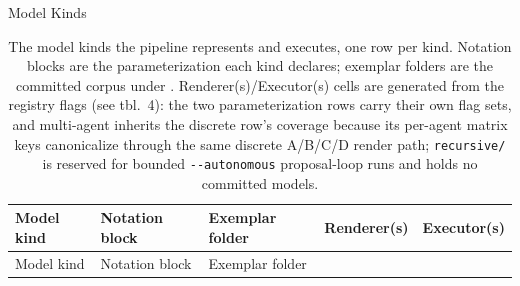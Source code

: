 \documentclass[
  ignorenonframetext,
]{beamer}
\begin{document}
\begin{frame}{Model Kinds}
\begin{longtable}[]{@{}
  >{\raggedright\arraybackslash}p{}
  >{\raggedright\arraybackslash}p{}
  >{\raggedright\arraybackslash}p{}
  >{\raggedright\arraybackslash}p{}
  >{\raggedright\arraybackslash}p{}@{}}
\caption{The model kinds the pipeline represents and executes, one row
per kind. Notation blocks are the parameterization each kind declares;
exemplar folders are the committed corpus under
\protect{}. Renderer(s)/Executor(s) cells are
generated from the registry flags (see
tbl.~4): the two parameterization rows
carry their own flag sets, and multi-agent inherits the discrete row's
coverage because its per-agent matrix keys canonicalize through the same
discrete A/B/C/D render path; \protect\texttt{recursive/} is reserved
for bounded \protect\texttt{-\/-autonomous} proposal-loop runs and holds
no committed models.}\label{tbl:model_kinds}\tabularnewline
\toprule\noalign{}
\begin{minipage}[b]{\linewidth}\raggedright
Model kind
\end{minipage} & \begin{minipage}[b]{\linewidth}\raggedright
Notation block
\end{minipage} & \begin{minipage}[b]{\linewidth}\raggedright
Exemplar folder
\end{minipage} & \begin{minipage}[b]{\linewidth}\raggedright
Renderer(s)
\end{minipage} & \begin{minipage}[b]{\linewidth}\raggedright
Executor(s)
\end{minipage} \\
\midrule\noalign{}
\endfirsthead
\toprule\noalign{}
\begin{minipage}[b]{\linewidth}\raggedright
Model kind
\end{minipage} & \begin{minipage}[b]{\linewidth}\raggedright
Notation block
\end{minipage} & \begin{minipage}[b]{\linewidth}\raggedright
Exemplar folder
\end{minipage} & \begin{minipage}[b]{\linewidth}\raggedright

\end{minipage}
\end{longtable}
\end{frame}
\end{document}

